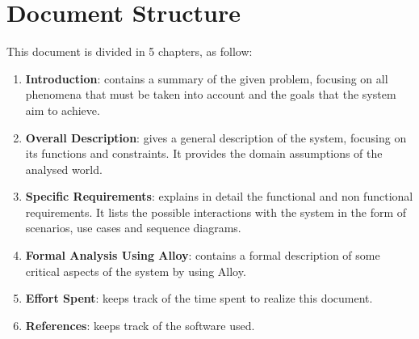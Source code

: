 \section{Document Structure}
This document is divided in 5 chapters, as follow:
\begin{enumerate}
	\item \textbf{Introduction}: contains a summary of the given problem, focusing on all phenomena that must be taken into account and the goals that the system aim to achieve.

	\item \textbf{Overall Description}: gives a general description of the system, focusing on its functions and constraints. It provides the domain assumptions of the analysed world.

	\item \textbf{Specific Requirements}: explains in detail the functional and non functional requirements. It lists the possible interactions with the system in the form of scenarios, use cases and sequence diagrams.

	\item \textbf{Formal Analysis Using Alloy}: contains a formal description of some critical aspects of the system by using Alloy.

	\item \textbf{Effort Spent}: keeps track of the time spent to realize this document.

        \item \textbf{References}: keeps track of the software used.
\end{enumerate}
